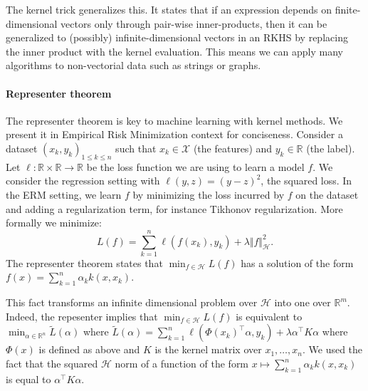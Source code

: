The kernel trick generalizes this. It states that if an expression depends on finite-dimensional vectors only through pair-wise inner-products, then it can be generalized to (possibly) infinite-dimensional vectors in an RKHS by replacing the inner product with the kernel evaluation. This means we can apply many algorithms to non-vectorial data such as strings or graphs.

\paragraph{Representer theorem} The representer theorem is key to machine learning with kernel methods. We present it in Empirical Risk Minimization context for conciseness. Consider a dataset $(x_k, y_k)_{1\leq k\leq n}$ such that $x_k\in\mathcal X$ (the features) and $y_k\in\mathbb R$ (the label). Let $\ell: \mathbb R \times\mathbb R\to\mathbb R$ be the loss function we are using to learn a model $f$. We consider the regression setting with $\ell(y, z) = (y - z) ^2$, the squared loss. In the ERM setting, we learn $f$ by minimizing the loss incurred by $f$ on the dataset and adding a regularization term, for instance Tikhonov regularization. More formally we minimize:
\begin{equation}
    L(f) = \sum_{k=1}^n \ell(f(x_k), y_k) + \lambda \Vert f \Vert_\mathcal H^2.
\end{equation}
The representer theorem states that $\min_{f\in\mathcal H}L(f)$ has a solution of the form $f(x)= \sum_{k=1}^n \alpha_k k(x, x_k)$.

This fact transforms an infinite dimensional problem over $\mathcal H$ into one over $\mathbb R^m$. Indeed, the repesenter implies that $\min_{f\in\mathcal H}L(f)$ is equivalent to $\min_{\alpha\in\mathbb R^n}\tilde L(\alpha)$ where $\tilde L(\alpha) = \sum_{k=1}^n \ell(\Phi(x_k)^\top\alpha, y_k) + \lambda \alpha^\top K \alpha$ where $\Phi(x)$ is defined as above and $K$ is the kernel matrix over $x_1, \ldots, x_n$. We used the fact that the squared $\mathcal H$ norm of a function of the form $x \mapsto \sum_{k=1}^n \alpha_k k(x, x_k)$ is equal to $\alpha^\top K \alpha$.


